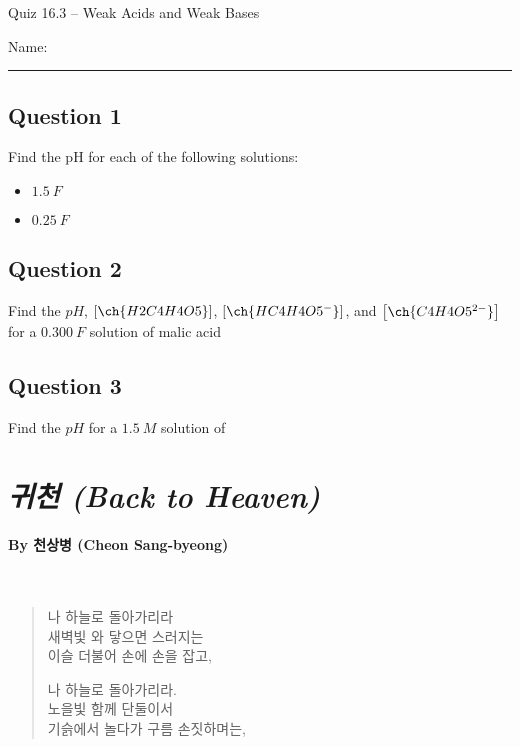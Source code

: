 \documentclass[11pt, letterpaper]{memoir}
\begin{document}
	\begin{center}
		{\large	Quiz 16.3 -- Weak Acids and Weak Bases}
	\end{center}
	{\large Name: \rule[-1mm]{4in}{.1pt} 
	
	
	\subsection*{Question 1}
	Find the pH for each of the following solutions:
	\begin{itemize}
		\item $1.5~F$ 
		
		\vspace{6em}
		\item $0.25~F$ 		
	\end{itemize}
	
	\vspace{6em}
	\subsection*{Question 2}
	Find the $pH$, $\left[\ch{H2C4H4O5}\right]$, $\left[\ch{HC4H4O5^-}\right]$, and  $\left[\ch{C4H4O5^{2-}}\right]$ for a $0.300~F$ solution of malic acid
	
	\vspace{14em}
	\subsection*{Question 3}
	Find the $pH$ for a $1.5~M$ solution of 
	\newpage
	\pagestyle{empty}
	\addtocounter{page}{-1}
	\section*{\emph{{귀천} (Back to Heaven)}}
	\paragraph{By {천상병} (Cheon Sang-byeong)}~
	
	{
		\begin{verse}
			나 하늘로 돌아가리라\\
			새벽빛 와 닿으면 스러지는\\
			이슬 더불어 손에 손을 잡고,
			
			나 하늘로 돌아가리라.\\
			노을빛 함께 단둘이서\\
			기슭에서 놀다가 구름 손짓하며는,
			

\end{verse}}}
\end{document}
